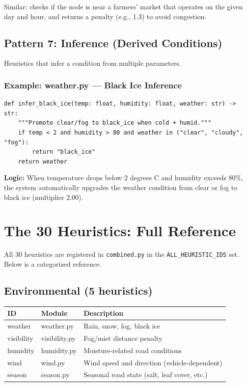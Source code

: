 \documentclass[12pt,a4paper]{article}
\begin{document}
Similar: checks if the node is near a farmers' market that operates on the given day and hour, and returns a penalty (e.g., 1.3) to avoid congestion.

\subsection{Pattern 7: Inference (Derived Conditions)}

Heuristics that infer a condition from multiple parameters.

\subsubsection{Example: weather.py --- Black Ice Inference}

\begin{lstlisting}
def infer_black_ice(temp: float, humidity: float, weather: str) -> str:
    """Promote clear/fog to black_ice when cold + humid."""
    if temp < 2 and humidity > 80 and weather in ("clear", "cloudy", "fog"):
        return "black_ice"
    return weather
\end{lstlisting}

\textbf{Logic:} When temperature drops below 2 degrees C and humidity exceeds 80\%, the system automatically upgrades the weather condition from clear or fog to black ice (multiplier 2.00).

\newpage

\section{The 30 Heuristics: Full Reference}

All 30 heuristics are registered in \texttt{combined.py} in the \texttt{ALL\_HEURISTIC\_IDS} set. Below is a categorized reference.

\subsection{Environmental (5 heuristics)}

\begin{table}[H]
\centering
\small
\begin{tabular}{lll}
\toprule
\textbf{ID} & \textbf{Module} & \textbf{Description} \\
\midrule
weather & weather.py & Rain, snow, fog, black ice \\
visibility & visibility.py & Fog/mist distance penalty \\
humidity & humidity.py & Moisture-related road conditions \\
wind & wind.py & Wind speed and direction (vehicle-dependent) \\
season & season.py & Seasonal road state (salt, leaf cover, etc.) \\
\bottomrule
\end{tabular}
\end{table}
\end{document}
